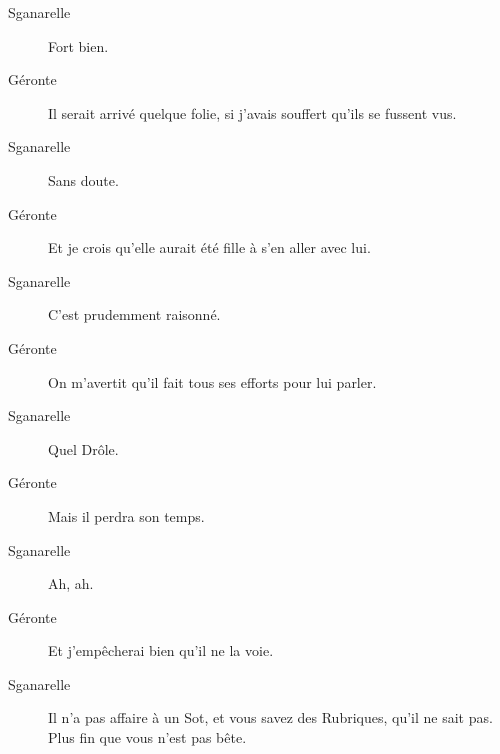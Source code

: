 \documentclass[french,twoside]{book} %
\begin{document}
 \begin{description} \item[Sganarelle] 

Fort bien.\end{description}
 \begin{description} \item[Géronte] 

Il serait arrivé quelque folie, si j’avais souffert qu’ils se fussent vus.\end{description}
 \begin{description} \item[Sganarelle] 

Sans doute.\end{description}
 \begin{description} \item[Géronte] 

Et je crois qu’elle aurait été fille à s’en aller avec lui.\end{description}
 \begin{description} \item[Sganarelle] 

C’est prudemment raisonné.\end{description}
 \begin{description} \item[Géronte] 

On m’avertit qu’il fait tous ses efforts pour lui parler.\end{description}
 \begin{description} \item[Sganarelle] 

Quel Drôle.\end{description}
 \begin{description} \item[Géronte] 

Mais il perdra son temps.\end{description}
 \begin{description} \item[Sganarelle] 

Ah, ah.\end{description}
 \begin{description} \item[Géronte] 

Et j’empêcherai bien qu’il ne la voie.\end{description}
 \begin{description} \item[Sganarelle] 

Il n’a pas affaire à un Sot, et vous savez des Rubriques, qu’il ne sait pas. Plus fin que vous n’est pas bête.\end{description}
\end{document}
